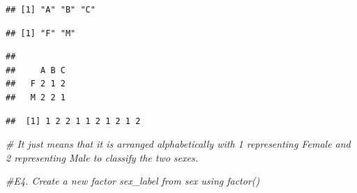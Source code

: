 \documentclass[
]{article}
\newenvironment{Shaded}{\begin{snugshade}}{\end{snugshade}}
\newcommand{\CommentTok}[1]{\textcolor[rgb]{0.56,0.35,0.01}{\textit{#1}}}
\newcommand{\FunctionTok}[1]{\textcolor[rgb]{0.13,0.29,0.53}{\textbf{#1}}}
\newcommand{\NormalTok}[1]{#1}
\newcommand{\SpecialCharTok}[1]{\textcolor[rgb]{0.81,0.36,0.00}{\textbf{#1}}}
\begin{document}
\begin{verbatim}
## [1] "A" "B" "C"
\end{verbatim}

\begin{Shaded}
\end{Shaded}

\begin{verbatim}
## [1] "F" "M"
\end{verbatim}

\begin{Shaded}
\end{Shaded}

\begin{verbatim}
##    
##     A B C
##   F 2 1 2
##   M 2 2 1
\end{verbatim}

\begin{Shaded}
\end{Shaded}

\begin{verbatim}
##  [1] 1 2 2 1 1 2 1 2 1 2
\end{verbatim}

\begin{Shaded}
\begin{Highlighting}[]
\CommentTok{\# It just means that it is arranged alphabetically with 1 representing Female and 2 representing Male to classify the two sexes.}
\end{Highlighting}
\end{Shaded}

\begin{Shaded}
\begin{Highlighting}[]
\CommentTok{\#E4. Create a new factor sex\_label from sex using factor()}
\end{Highlighting}
\end{Shaded}
\end{document}
